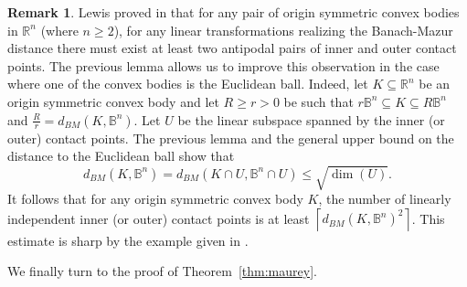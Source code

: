 \documentclass[12pt,a4paper]{article}
\theoremstyle{definition}
\newtheorem{remark}[twr]{Remark}
\newcommand\R{\mathbb{R}}
\newcommand\B{\mathbb{B}}
\begin{document}
\begin{remark}
\label{rem:contact_pairs}
Lewis proved in \cite[Theorem~$2.1$]{lewis} that for any pair of origin symmetric convex bodies in $\R^n$ (where $n \geq 2$), for any linear transformations realizing the Banach-Mazur distance there must exist at least two antipodal pairs of inner and outer contact points. The previous lemma allows us to improve this observation in the case where one of the convex bodies is the Euclidean ball. Indeed, let $K \subseteq \R^n$ be an origin symmetric convex body and let $R \geq r > 0$ be such that $r\B^n \subseteq K \subseteq R\B^n$ and $\frac{R}{r} = d_{BM}(K,\B^n)$. Let $U$ be the linear subspace spanned by the inner (or outer) contact points. The previous lemma and the general upper bound on the distance to the Euclidean ball show that
$$ d_{BM}(K,\B^n) = d_{BM}(K \cap U, \B^n \cap U) \leq \sqrt{\dim(U)}. $$
It follows that for any origin symmetric convex body $K$, the number of linearly independent inner (or outer) contact points is at least $\left\lceil d_{BM}(K, \B^n)^2 \right\rceil$. This estimate is sharp by the example given in \cite[Theorem~$4.3$~(a)]{praetorius}.
\end{remark}



We finally turn to the proof of Theorem~\ref{thm:maurey}.
\end{document}
